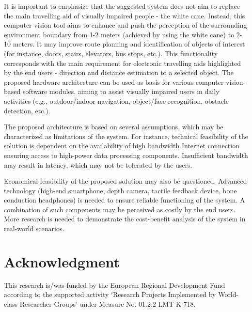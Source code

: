 \documentclass[10pt,conference,compsocconf]{IEEEtran}
\begin{document}
It is important to emphasize that the suggested system does not aim to replace the main travelling aid of visually impaired people - the white cane. Instead, this computer vision tool aims to enhance and push the perception of the surrounding environment boundary from 1-2 meters (achieved by using the white cane) to 2-10 meters. It may improve route planning and identification of objects of interest (for instance, doors, stairs, elevators, bus stops, etc.). This functionality corresponds with the main requirement for electronic travelling aids highlighted by the end users - direction and distance estimation to a selected object. The proposed hardware architecture can be used as basis for various computer vision-based software modules, aiming to assist visually impaired users in daily activities (e.g., outdoor/indoor navigation, object/face recognition, obstacle detection, etc.). 


The proposed architecture is based on several assumptions, which may be characterized as limitations of the system. For instance, technical feasibility of the solution is dependent on the availability of high bandwidth Internet connection ensuring access to high-power data processing components. Insufficient bandwidth may result in latency, which may not be tolerated by the users.  

Economical feasibility of the proposed solution may also be questioned. Advanced technology (high-end smartphone, depth camera, tactile feedback device, bone conduction headphones) is needed to ensure reliable functioning of the system. A combination of such components may be perceived as costly by the end users. More research is needed to demonstrate the cost-benefit analysis of the system in real-world scenarios. 

\section*{Acknowledgment}
This research is/was funded by the European Regional Development Fund according to the supported activity ‘Research Projects Implemented by World-class Researcher Groups’ under Measure No. 01.2.2-LMT-K-718.






\end{document}
